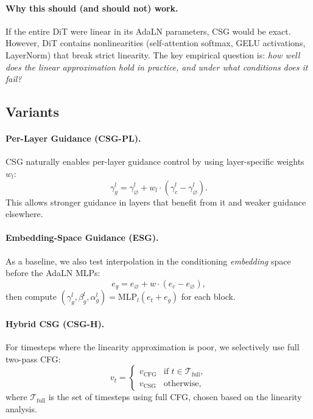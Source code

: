 \documentclass{article}
\newcommand{\adaln}{AdaLN}
\begin{document}
\paragraph{Why this should (and should not) work.}
If the entire DiT were linear in its \adaln{} parameters, CSG would be exact. However, DiT contains nonlinearities (self-attention softmax, GELU activations, LayerNorm) that break strict linearity. The key empirical question is: \textit{how well does the linear approximation hold in practice, and under what conditions does it fail?}

\subsection{Variants}

\paragraph{Per-Layer Guidance (CSG-PL).}
CSG naturally enables per-layer guidance control by using layer-specific weights $w_l$:
\begin{equation}
    \gamma_g^l = \gamma_\varnothing^l + w_l \cdot (\gamma_c^l - \gamma_\varnothing^l).
\end{equation}
This allows stronger guidance in layers that benefit from it and weaker guidance elsewhere.

\paragraph{Embedding-Space Guidance (ESG).}
As a baseline, we also test interpolation in the conditioning \textit{embedding} space before the \adaln{} MLPs:
\begin{equation}
    e_g = e_\varnothing + w \cdot (e_c - e_\varnothing),
\end{equation}
then compute $(\gamma_g^l, \beta_g^l, \alpha_g^l) = \text{MLP}_l(e_t + e_g)$ for each block.

\paragraph{Hybrid CSG (CSG-H).}
For timesteps where the linearity approximation is poor, we selectively use full two-pass CFG:
\begin{equation}
    v_t = \begin{cases}
        v_{\text{CFG}} & \text{if } t \in \mathcal{T}_{\text{full}}, \\
        v_{\text{CSG}} & \text{otherwise},
    \end{cases}
\end{equation}
where $\mathcal{T}_{\text{full}}$ is the set of timesteps using full CFG, chosen based on the linearity analysis.
\end{document}
